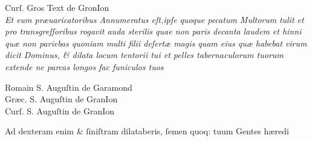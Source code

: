 \documentclass{article}
\newcommand{\threecolumntypefacenames}[3]{\begin{multicols}{3}
		\tiny
		\hfill \qquad \qquad \qquad \qquad #1\hspace*{\fill}\\
		\columnbreak
		\hfill #2\hspace*{\fill}\\
		\columnbreak
		\hfill #3\qquad \qquad \qquad \qquad \hspace*{\fill}
\end{multicols}}
\begin{document}
{\begin{multicols}{2}
	\columnbreak
	\tiny
	\centering
	Curſ. Gros Text de GronIon\\
	\vspace{0.5\baselineskip}
	\small
	\justifying
	\noindent
	\textit{Et eum pr\ae{}uaricatoribus Annumeratus eſt,ipſe quoque pecatum Multorum\linebreak}
	\textit{tulit et pro transgreſſoribus rogavit auda sterilis quae non paris decanta laudem et hinni qu\ae{} non pariebas quoniam multi filii deſert\ae{} magis quam eius qu\ae{} habebat virum dicit Dominus, \& dilata locum tentorii tui et pelles tabernaculorum tuorum extende ne parcas longos fac funiculos tuos\\}
\end{multicols}
\vspace{-3\baselineskip}
\threecolumntypefacenames{Romain S. Auguſtin de Garamond}{Gr\ae{}c. S. Auguſtin de GranIon}{Curſ. S. Auguſtin de GranIon}
\vspace{-2\baselineskip}
\begin{multicols}{2}
	\fontsize{8}{9}\selectfont
	\justifying
	\noindent \quad Ad dexteram enim \& ſiniſtram dilataberis, ſemen quoq: tuum Gentes h\ae{}redi\linebreak


\end{multicols}}
\end{document}
